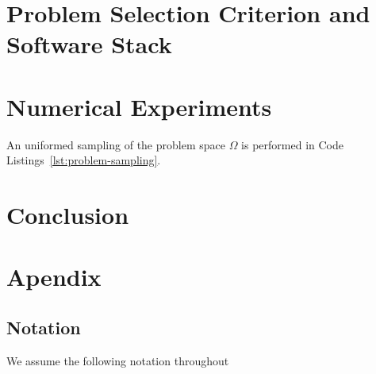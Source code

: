 \documentclass[10pt]{article}
\begin{document}
    \medskip

    \section{Problem Selection Criterion and Software Stack}
        \label{sec:problems}
        \medskip


    \section{Numerical Experiments}
        \label{sec:experiments}
        \medskip
        An uniformed sampling of the problem space $\Omega$ is performed
        in Code Listings~\ref{lst:problem-sampling}.

    \section{Conclusion}
        \label{sec:conclusion}
        \medskip
        \medskip

    \newpage
    \section{Apendix}

    
    


\subsection*{Notation}
    
    We assume the following notation throughout
\end{document}
